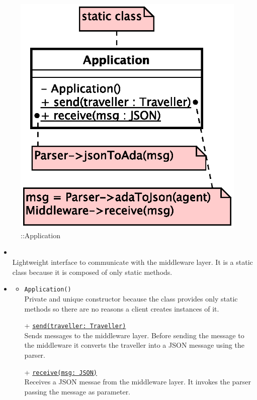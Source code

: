 \begin{figure}[h]
\centering
\includegraphics[scale=0.6,keepaspectratio]{images/solution/app/backend/application.eps}
\caption{\pInterface::Application}
\label{fig:sd-app-application}
\end{figure}
\FloatBarrier
\begin{itemize}
  \item \textbf{\descr} \\
    Lightweight interface to communicate with the middleware layer.
    It is a static class because it is composed of only static methods.
  \item \textbf{\ops}
  \begin{itemize}
   \item \texttt{Application()} \\
   Private and unique constructor because the class provides only static methods 
    so there are no reasons a client creates instances of it.
    \item[+] \texttt{\underline{send(traveller: Traveller)}} \\
    Sends messages to the middleware layer. Before sending the message to the
    middleware it converts the traveller into a JSON message using the parser.
    \item[+] \texttt{\underline{receive(msg: JSON)}} \\
    Receives a JSON messae from the middleware layer. It invokes the parser 
    passing the message as parameter.
  \end{itemize}
\end{itemize}
